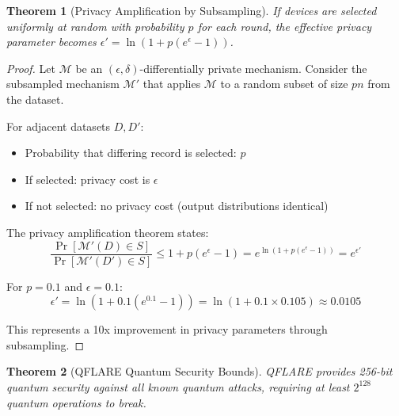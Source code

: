 \documentclass[11pt]{article}
\newtheorem{theorem}{Theorem}
\begin{document}
\begin{theorem}[Privacy Amplification by Subsampling]
If devices are selected uniformly at random with probability $p$ for each round, 
the effective privacy parameter becomes $\epsilon' = \ln(1 + p(e^\epsilon - 1))$.
\end{theorem}

\begin{proof}
Let $\mathcal{M}$ be an $(\epsilon, \delta)$-differentially private mechanism. 
Consider the subsampled mechanism $\mathcal{M}'$ that applies $\mathcal{M}$ to a random 
subset of size $pn$ from the dataset.

For adjacent datasets $D, D'$:
\begin{itemize}
\item Probability that differing record is selected: $p$
\item If selected: privacy cost is $\epsilon$
\item If not selected: no privacy cost (output distributions identical)
\end{itemize}

The privacy amplification theorem states:
$$\frac{\Pr[\mathcal{M}'(D) \in S]}{\Pr[\mathcal{M}'(D') \in S]} \leq 1 + p(e^\epsilon - 1) = e^{\ln(1 + p(e^\epsilon - 1))} = e^{\epsilon'}$$

For $p = 0.1$ and $\epsilon = 0.1$:
$$\epsilon' = \ln(1 + 0.1(e^{0.1} - 1)) = \ln(1 + 0.1 \times 0.105) \approx 0.0105$$

This represents a 10x improvement in privacy parameters through subsampling.
\end{proof}
        


\begin{theorem}[QFLARE Quantum Security Bounds]
QFLARE provides 256-bit quantum security against all known quantum attacks, 
requiring at least $2^{128}$ quantum operations to break.
\end{theorem}
\end{document}
